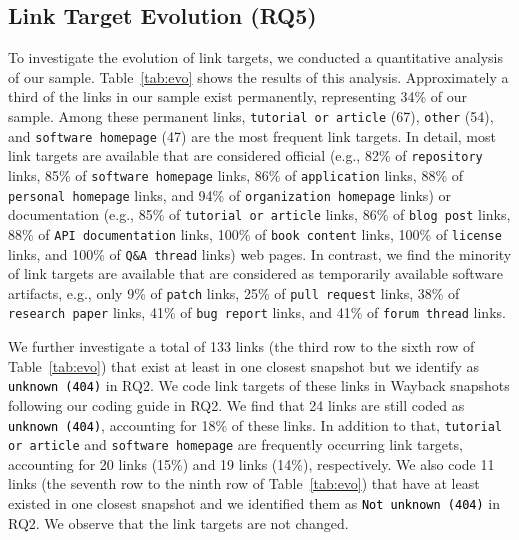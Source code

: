 \documentclass[smallextended]{svjour3}       %
\newcommand{\fix}[1]{\textcolor{black}{#1}}
\newcommand{\minor}[1]{\textcolor{black}{#1}}
\begin{document}
\subsection{Link Target Evolution (RQ5)}
To investigate the evolution of link targets, we conducted a quantitative analysis of our sample. Table~\ref{tab:evo} shows the results of this analysis. Approximately a third of the links in our sample exist permanently, representing 34\% of our sample. Among these permanent links, \texttt{tutorial or article} (67), \texttt{other} (54), and \texttt{software homepage} (47) are the most frequent link targets. In detail, most link targets are available that are considered official (e.g., 82\% of \texttt{repository} links, 85\% of \texttt{software homepage} links, 86\% of \texttt{application} links, 88\% of \texttt{personal homepage} links, and 94\% of \texttt{organization homepage} links) or documentation (e.g., 85\% of \texttt{tutorial or article} links, 86\% of \texttt{blog post} links, 88\% of \texttt{API documentation} links, 100\% of \texttt{book content} links, 100\% of \texttt{license} links, and 100\% of \texttt{Q\&A thread} links) \fix{w}eb pages. In contrast, we find the minority of link targets are available that are considered as temporarily available software artifacts, e.g., only 9\% of \texttt{patch} links, 25\% of \texttt{pull request} links, 38\% of \texttt{research paper} links, 41\% of \texttt{bug report} links, and 41\% of \texttt{forum thread} links.

We further investigate a total of 133 links (the third row to the sixth row of Table~\ref{tab:evo}) that exist at least in one closest snapshot but we identify as \minor{\texttt{unknown (404)}} in RQ2. We code link targets of these links in Wayback snapshots following our coding guide in RQ2. We find that 24 links are still coded as \minor{\texttt{unknown (404)}}, accounting for 18\% of these links. In addition to that, \texttt{tutorial or article} and \texttt{software homepage} are frequently occurring link targets, accounting for 20 links (15\%) and 19 links (14\%), respectively. 
We also code 11 links (the seventh row to the ninth row of Table~\ref{tab:evo}) that have at least existed in one closest snapshot and we identified them as \minor{\texttt{Not unknown (404)}} in RQ2. We observe that the link targets are not changed.
\end{document}
